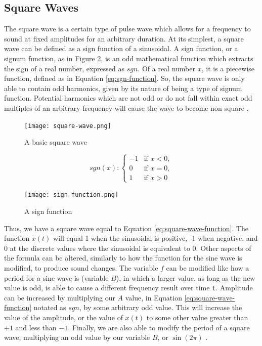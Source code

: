 \subsection{Square Waves}

The square wave is a certain type of pulse wave which allows for a frequency to sound at fixed amplitudes for an arbitrary duration. At its simplest, a square wave can be defined as a sign function of a sinusoidal. A sign function, or a signum function, as in Figure \ref{fig:sign-function}, is an odd mathematical function which extracts the sign of a real number, expressed as $sgn$. Of a real number $x$, it is a piecewise function, defined as in Equation \ref{eq:sgn-function}. So, the square wave is only able to contain odd harmonics, given by its nature of being a type of signum function. Potential harmonics which are not odd or do not fall within exact odd multiples of an arbitrary frequency will cause the wave to become non-square \cite{Case_2007}.

\begin{figure}[ht]
  \centering
  \texttt{[image: square-wave.png]}
  \caption{A basic square wave}
  \label{fig:square-wave}
\end{figure}

\begin{equation}
	sgn (x): \begin{cases}
		-1 & \textrm{if } x < 0, \\
		0 & \textrm{if } x = 0, \\
		1 & \textrm{if } x > 0
	\end{cases}
	\label{eq:sgn-function}
\end{equation}

\begin{figure}[ht]
  \centering
  \texttt{[image: sign-function.png]}
  \caption{A sign function}
  \label{fig:sign-function}
\end{figure}

Thus, we have a square wave equal to Equation \ref{eq:square-wave-function}. The function $x(t)$ will equal 1 when the sinusoidal is positive, -1 when negative, and 0 at the discrete values where the sinusoidal is equivalent to 0. Other aspects of the formula can be altered, similarly to how the function for the sine wave is modified, to produce sound changes. The variable $f$ can be modified like how a period for a sine wave is (variable $B$), in which a larger value, as long as the new value is odd, is able to cause a different frequency result over time \texttt{t}. Amplitude can be increased by multiplying our $A$ value, in Equation \ref{eq:square-wave-function} notated as $sgn$, by some arbitrary odd value. This will increase the value of the amplitude, or the value of $x(t)$ to some other value greater than $+1$ and less than $-1$. Finally, we are also able to modify the period of a square wave, multiplying an odd value by our variable $B$, or $\sin(2\pi)$ \cite{Case_2007}.

